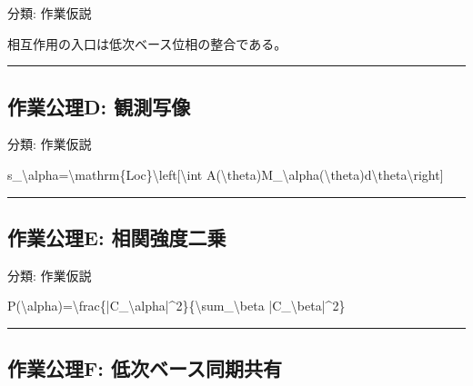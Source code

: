 \documentclass[
  a4paper,
]{ltjsarticle}
\newenvironment{Shaded}{}{}
\newcommand{\NormalTok}[1]{#1}
\begin{document}
分類: 作業仮説

相互作用の入口は低次ベース位相の整合である。

\begin{center}\rule{0.5\linewidth}{0.5pt}\end{center}

\subsection{作業公理D:
観測写像}\label{ux4f5cux696dux516cux7406d-ux89b3ux6e2cux5199ux50cf}

分類: 作業仮説

\begin{Shaded}
\begin{Highlighting}[]
\NormalTok{s\_\textbackslash{}alpha=\textbackslash{}mathrm\{Loc\}\textbackslash{}left[\textbackslash{}int A(\textbackslash{}theta)M\_\textbackslash{}alpha(\textbackslash{}theta)d\textbackslash{}theta\textbackslash{}right]}
\end{Highlighting}
\end{Shaded}

\begin{center}\rule{0.5\linewidth}{0.5pt}\end{center}

\subsection{作業公理E:
相関強度二乗}\label{ux4f5cux696dux516cux7406e-ux76f8ux95a2ux5f37ux5ea6ux4e8cux4e57}

分類: 作業仮説

\begin{Shaded}
\begin{Highlighting}[]
\NormalTok{P(\textbackslash{}alpha)=\textbackslash{}frac\{|C\_\textbackslash{}alpha|\^{}2\}\{\textbackslash{}sum\_\textbackslash{}beta |C\_\textbackslash{}beta|\^{}2\}}
\end{Highlighting}
\end{Shaded}

\begin{center}\rule{0.5\linewidth}{0.5pt}\end{center}

\subsection{作業公理F:
低次ベース同期共有}\label{ux4f5cux696dux516cux7406f-ux4f4eux6b21ux30d9ux30fcux30b9ux540cux671fux5171ux6709}
\end{document}
